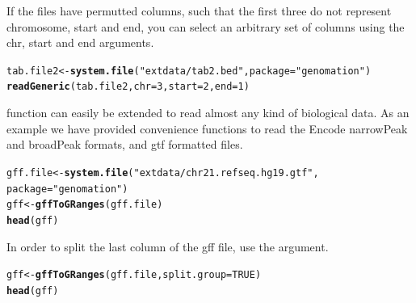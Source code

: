 \documentclass{article}\usepackage[]{graphicx}\usepackage[]{color}
\makeatletter
\newcommand{\hlnum}[1]{\textcolor[rgb]{0.686,0.059,0.569}{#1}}%
\newcommand{\hlstr}[1]{\textcolor[rgb]{0.192,0.494,0.8}{#1}}%
\newcommand{\hlstd}[1]{\textcolor[rgb]{0.345,0.345,0.345}{#1}}%
\newcommand{\hlkwb}[1]{\textcolor[rgb]{0.69,0.353,0.396}{#1}}%
\newcommand{\hlkwc}[1]{\textcolor[rgb]{0.333,0.667,0.333}{#1}}%
\newcommand{\hlkwd}[1]{\textcolor[rgb]{0.737,0.353,0.396}{\textbf{#1}}}%
\newenvironment{kframe}{%
 \def\at@end@of@kframe{}%
 \ifinner\ifhmode%
  \def\at@end@of@kframe{\end{minipage}}%
  \begin{minipage}{\columnwidth}%
 \fi\fi%
 \def\FrameCommand##1{\hskip\@totalleftmargin \hskip-\fboxsep
 \colorbox{shadecolor}{##1}\hskip-\fboxsep
     \hskip-\linewidth \hskip-\@totalleftmargin \hskip\columnwidth}%
 \MakeFramed {\advance\hsize-\width
   \@totalleftmargin\z@ \linewidth\hsize
   \@setminipage}}%
 {\par\unskip\endMakeFramed%
 \at@end@of@kframe}
\newenvironment{knitrout}{}{} %
\makeatother
\begin{document}
If the files have permutted columns, such that the first three do not represent
chromosome, start and end, you can select an arbitrary set of columns using the
chr, start and end arguments.
\begin{knitrout}
\color{fgcolor}\begin{kframe}
\begin{alltt}
\hlstd{tab.file2} \hlkwb{<-} \hlkwd{system.file}\hlstd{(}\hlstr{"extdata/tab2.bed"}\hlstd{,} \hlkwc{package} \hlstd{=} \hlstr{"genomation"}\hlstd{)}
\hlkwd{readGeneric}\hlstd{(tab.file2,} \hlkwc{chr} \hlstd{=} \hlnum{3}\hlstd{,} \hlkwc{start} \hlstd{=} \hlnum{2}\hlstd{,} \hlkwc{end} \hlstd{=} \hlnum{1}\hlstd{)}
\end{alltt}
\end{kframe}
\end{knitrout}


\Rcode{readGeneric]} function can easily be extended to read almost any kind of 
biological data. As an example we have provided convenience functions to read the Encode
narrowPeak and broadPeak formats, and gtf formatted files.
\begin{knitrout}
\color{fgcolor}\begin{kframe}
\begin{alltt}
\hlstd{gff.file} \hlkwb{<-} \hlkwd{system.file}\hlstd{(}\hlstr{"extdata/chr21.refseq.hg19.gtf"}\hlstd{,}
    \hlkwc{package} \hlstd{=} \hlstr{"genomation"}\hlstd{)}
\hlstd{gff} \hlkwb{<-} \hlkwd{gffToGRanges}\hlstd{(gff.file)}
\hlkwd{head}\hlstd{(gff)}
\end{alltt}
\end{kframe}
\end{knitrout}


In order to split the last column of the gff file, use the 
argument.
\begin{knitrout}
\color{fgcolor}\begin{kframe}
\begin{alltt}
\hlstd{gff} \hlkwb{<-} \hlkwd{gffToGRanges}\hlstd{(gff.file,} \hlkwc{split.group} \hlstd{=} \hlnum{TRUE}\hlstd{)}
\hlkwd{head}\hlstd{(gff)}
\end{alltt}
\end{kframe}
\end{knitrout}
\end{document}
